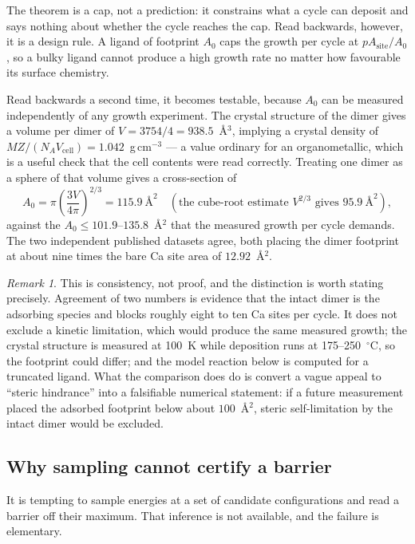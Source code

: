 \documentclass[11pt,a4paper]{article}
\theoremstyle{plain}
\theoremstyle{definition}
\theoremstyle{remark}
\newtheorem{remark}[theorem]{Remark}
\begin{document}
The theorem is a cap, not a prediction: it constrains what a cycle can deposit
and says nothing about whether the cycle reaches the cap. Read backwards,
however, it is a design rule. A ligand of footprint $A_0$ caps the growth per
cycle at $pA_{\mathrm{site}}/A_0$, so a bulky ligand cannot produce a high
growth rate no matter how favourable its surface chemistry.

Read backwards a second time, it becomes testable, because $A_0$ can be
measured independently of any growth experiment. The crystal structure of the
dimer \citep{Kim2016} gives a volume per dimer of
$V=3754/4=938.5$~\AA$^3$, implying a crystal density of
$MZ/(N_A V_{\mathrm{cell}})=1.042$~g\,cm$^{-3}$ --- a value ordinary for an
organometallic, which is a useful check that the cell contents were read
correctly. Treating one dimer as a sphere of that volume gives a cross-section
of
\[
A_0 = \pi\left(\frac{3V}{4\pi}\right)^{2/3} = 115.9\ \text{\AA}^2
  \quad (\text{the cube-root estimate } V^{2/3} \text{ gives } 95.9\ \text{\AA}^2),
\]
against the $A_0\le101.9$--$135.8$~\AA$^2$ that the measured growth per cycle
demands. The two independent published datasets agree, both placing the dimer
footprint at about nine times the bare Ca site area of $12.92$~\AA$^2$.

\begin{remark}
This is consistency, not proof, and the distinction is worth stating precisely.
Agreement of two numbers is evidence that the intact dimer is the adsorbing
species and blocks roughly eight to ten Ca sites per cycle. It does not exclude
a kinetic limitation, which would produce the same measured growth; the crystal
structure is measured at 100~K while deposition runs at 175--250~$^\circ$C, so
the footprint could differ; and the model reaction below is computed for a
truncated ligand. What the comparison does do is convert a vague appeal to
``steric hindrance'' into a falsifiable numerical statement: if a future
measurement placed the adsorbed footprint below about $100$~\AA$^2$, steric
self-limitation by the intact dimer would be excluded.
\end{remark}

\subsection{Why sampling cannot certify a barrier}

It is tempting to sample energies at a set of candidate configurations and read
a barrier off their maximum. That inference is not available, and the failure
is elementary.
\end{document}

